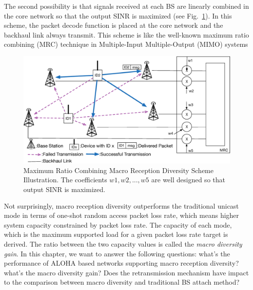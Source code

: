 The second possibility is that signals received at each BS are linearly combined in the core network so that the output SINR is maximized (see Fig.~\ref{fig:mrc_macro_diversity_recpetion_illustration}). In this scheme, the packet decode function is placed at the core network and the backhaul link always transmit. This scheme is like the well-known maximum ratio combining (MRC) technique in Multiple-Input Multiple-Output (MIMO) systems
\begin{figure}[!ht]
	\centering
	\includegraphics[width=\linewidth]{Chapter5/Figures/MRC_Type_Macro_Diversity_Recpetion_Illustration}
	\caption{Maximum Ratio Combining Macro Reception Diversity Scheme Illustration. The coefficients $w1, w2, ..., w5$ are well designed so that output SINR is maximized.}
	\label{fig:mrc_macro_diversity_recpetion_illustration}
\end{figure} 

Not surprisingly, macro reception diversity outperforms the traditional unicast mode in terms of one-shot random access packet loss rate, which means higher system capacity constrained by packet loss rate.
The capacity of each mode, which is the maximum supported load for a given packet loss rate target is derived. The ratio between the two capacity values is called the \emph{macro diversity gain}.
In this chapter, we want to answer the following questions: what's the performance of ALOHA based networks supporting macro reception diversity? what's the macro diversity gain? Does the retransmission mechanism have impact to the comparison between macro diversity and traditional BS attach method?

